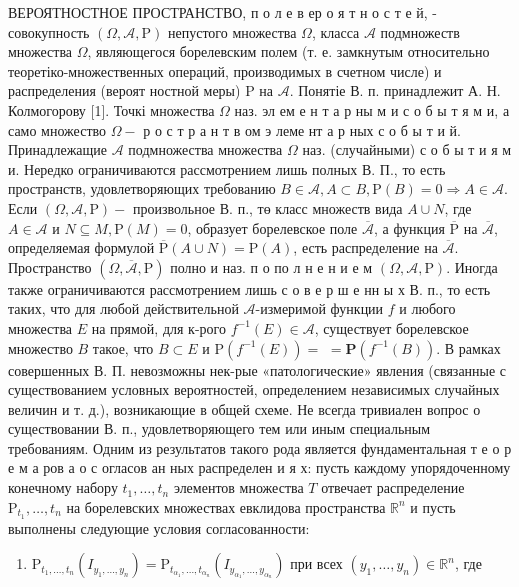 \documentclass[10pt]{article}
\begin{document}
ВЕРОЯТНОСТНОЕ ПРОСТРАНСТВО, п о л е в ер о я т н о с т е й, - совокупность $(\Omega, \mathcal{A}, \mathrm{P})$ непустого множества $\Omega$, класса $\mathcal{A}$ подмножеств множества $\Omega$, являющегося борелевским полем (т. е. замкнутым относительно теоретіко-множественных операций, производимых в счетном числе) и распределения (вероят ностной меры) $\mathrm{P}$ на $\mathcal{A}$. Понятіе В. п. принадлежит А. Н. Колмогорову [1]. Точкі множества $\Omega$ наз. эл ем е н т а р ны м и с о б ы т я м и, а само множество $\Omega-$ р о с т р а н т в ом э леме нт а р ных с о б ы т и й. Принадлежащие $\mathcal{A}$ подмножества множества $\Omega$ наз. (случайными) с о б ы т и я м и. Нередко ограничиваются рассмотрением лишь полных В. П., то есть пространств, удовлетворяющих требованию $B \in \mathcal{A}, A \subset B, \mathrm{P}(B)=0 \Rightarrow A \in \mathcal{A}$. Если $(\Omega, \mathcal{A}, \mathrm{P})-$ произвольное В. п., тө класс множеств вида $A \cup N$, где $A \in \mathcal{A}$ и $N \subseteq M, \mathrm{P}(M)=0$, образует борелевское поле $\overline{\mathcal{A}}$, а функция $\overline{\mathrm{P}}$ на $\overline{\mathcal{A}}$, определяемая формулой $\overline{\mathrm{P}}(A \cup N)=\mathrm{P}(A)$, есть распределение на $\overline{\mathcal{A}}$. Пространство $(\Omega, \overline{\mathcal{A}}, \mathrm{P})$ полно и наз. п о по л н е н и е м $(\Omega, \mathcal{A}, \mathrm{P})$. Иногда также ограничиваются рассмотрением лишь с о в е р ш е нн ы х В. п., то есть таких, что для любой действительной $\mathcal{A}$-измеримой функции $f$ и любого множества $E$ на прямой, для к-рого $f^{-1}(E) \in \mathcal{A}$, существует борелевское множество $B$ такое, что $B \subset E$ и $\mathrm{P}\left(f^{-1}(E)\right)=$ $=\mathbf{P}\left(f^{-1}(B)\right)$. В рамках совершенных В. П. невозможны нек-рые «патологические» явления (связанные с существованием условных вероятностей, определением независимых случайных величин и т. д.), возникающие в общей схеме. Не всегда тривиален вопрос о существовании В. п., удовлетворяющего тем или иным специальным требованиям. Одним из результатов такого рода является фундаментальная т е о р е м а ров а о с огласов ан ных распределен и я х: пусть каждому упорядоченному конечному набору $t_{1}, \ldots, t_{n}$ элементов множества $T$ отвечает распределение $\mathrm{P}_{t_{1}}, \ldots, t_{n}$ на борелевских множествах евклидова пространства $\mathbb{R}^{n}$ и пусть выполнены следующие условия согласованности:



\begin{enumerate}

  \item $\mathrm{P}_{t_{1}, \ldots, t_{n}}\left(I_{y_{1}, \ldots, y_{n}}\right)=\mathrm{P}_{t_{\alpha_{1}}, \ldots, t_{\alpha_{n}}}\left(I_{y_{\alpha_{1}}, \ldots, y_{\alpha_{n}}}\right)$ при всех $\left(y_{1}, \ldots, y_{n}\right) \in \mathbb{R}^{n}$, где

\end{enumerate}
\end{document}
